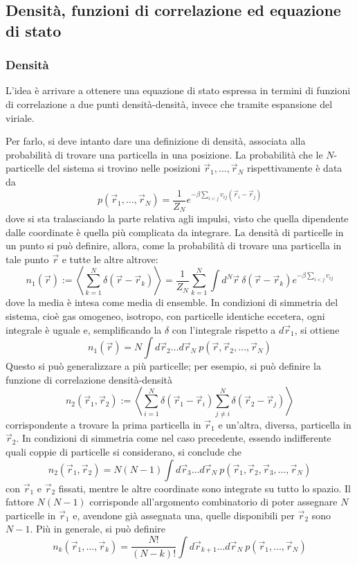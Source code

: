\documentclass[11pt, a4paper]{scrartcl}
\theoremstyle{style}
\theoremstyle{style1}
\numberwithin{equation}{subsection}
\begin{document}
\subsection{Densit\`a, funzioni di correlazione ed equazione di stato}
\subsubsection{Densit\`a}


L'idea \`e arrivare a ottenere una equazione di stato espressa in termini di funzioni di correlazione a due punti densit\`a-densit\`a, invece che tramite espansione del viriale.

Per farlo, si deve intanto dare una definizione di densit\`a, associata alla probabilit\`a di trovare una particella in una posizione.
La probabilit\`a che le $N$-particelle del sistema si trovino nelle posizioni $\vec{r}_1,\ldots, \vec{r}_N$ rispettivamente \`e data da 
\[
p (\vec{r}_1,\ldots,\vec{r}_N) = \frac{1}{Z_N} e^{-\beta \sum_{i<j}^{} v_{ij} (\vec{r}_i-\vec{r}_j)}
\] 
dove si sta tralasciando la parte relativa agli impulsi, visto che quella dipendente dalle coordinate \`e quella pi\`u complicata da integrare.
La densit\`a di particelle in un punto si pu\`o definire, allora, come la probabilit\`a di trovare una particella in tale punto $\vec{r}$ e tutte le altre altrove:
\[
n_1(\vec{r}) := \left\langle \sum_{k=1}^{N} \delta (\vec{r}-\vec{r}_k) \right\rangle = \frac{1}{Z_N}\sum_{k=1}^{N} \int d^N \vec{r} \ \delta (\vec{r}-\vec{r}_k) e^{-\beta  \sum_{i<j}^{} v_{ij} }
\] 
dove la media \`e intesa come media di ensemble.
In condizioni di simmetria del sistema, cio\`e gas omogeneo, isotropo, con particelle identiche eccetera, ogni integrale \`e uguale e, semplificando la $\delta $ con l'integrale rispetto a $d\vec{r}_1$, si ottiene
\begin{equation}
n_1(\vec{r}) = N \int d\vec{r}_2 \ldots d\vec{r}_N\ p (\vec{r},\vec{r}_2,\ldots,\vec{r}_N)
\end{equation}
Questo si pu\`o generalizzare a pi\`u particelle; per esempio, si pu\`o definire la funzione di correlazione densit\`a-densit\`a
\[
	n_2(\vec{r}_1,\vec{r}_2) := \left\langle \sum_{i=1}^{N} \delta (\vec{r}_1- \vec{r}_i) \sum_{j\neq i}^{N} \delta (\vec{r}_2- \vec{r}_j) \right\rangle
\] 
corrispondente a trovare la prima particella in $\vec{r}_1$ e un'altra, diversa, particella in $\vec{r}_2$.
In condizioni di simmetria come nel caso precedente, essendo indifferente quali coppie di particelle si considerano, si conclude che
\begin{equation}
	n_2(\vec{r}_1, \vec{r}_2) = N(N-1) \int d\vec{r}_3 \ldots d\vec{r}_N \ p(\vec{r}_1, \vec{r}_2,\vec{r}_3,\ldots, \vec{r}_N)
\end{equation}
con $\vec{r}_1$ e $\vec{r}_2$ fissati, mentre le altre coordinate sono integrate su tutto lo spazio. 
Il fattore $N(N-1)$ corrisponde all'argomento combinatorio di poter assegnare $N$ particelle in $\vec{r}_1$ e, avendone gi\`a assegnata una, quelle disponibili per $\vec{r}_2$ sono $N-1$.
Pi\`u in generale, si pu\`o definire
\[
n_k (\vec{r}_1,\ldots,\vec{r}_k) = \frac{N!}{(N-k)!} \int d\vec{r}_{k+1} \ldots d\vec{r}_N \ p(\vec{r}_1,\ldots,\vec{r}_N)
\] 
\end{document}
